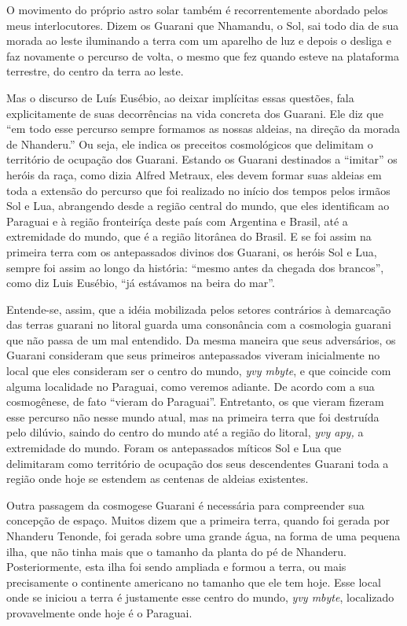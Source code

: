 O movimento do próprio astro solar também é recorrentemente abordado
pelos meus interlocutores. Dizem os Guarani que Nhamandu, o Sol, sai
todo dia de sua morada ao leste iluminando a terra com um aparelho de
luz e depois o desliga e faz novamente o percurso de volta, o mesmo que
fez quando esteve na plataforma terrestre, do centro da terra ao leste.

Mas o discurso de Luís Eusébio, ao deixar implícitas essas questões,
fala explicitamente de suas decorrências na vida concreta dos Guarani.
Ele diz que ``em todo esse percurso sempre formamos as nossas aldeias,
na direção da morada de Nhanderu.'' Ou seja, ele indica os preceitos
cosmológicos que delimitam o território de ocupação dos Guarani. Estando
os Guarani destinados a ``imitar'' os heróis da raça, como dizia Alfred
Metraux, eles devem formar suas aldeias em toda a extensão do percurso
que foi realizado no início dos tempos pelos irmãos Sol e Lua,
abrangendo desde a região central do mundo, que eles identificam ao
Paraguai e à região fronteiríça deste país com Argentina e Brasil, até a
extremidade do mundo, que é a região litorânea do Brasil. E se foi assim
na primeira terra com os antepassados divinos dos Guarani, os heróis Sol
e Lua, sempre foi assim ao longo da história: ``mesmo antes da chegada
dos brancos'', como diz Luis Eusébio, ``já estávamos na beira do mar''.

Entende-se, assim, que a idéia mobilizada pelos setores contrários à
demarcação das terras guarani no litoral guarda uma consonância com a
cosmologia guarani que não passa de um mal entendido. Da mesma maneira
que seus adversários, os Guarani consideram que seus primeiros
antepassados viveram inicialmente no local que eles consideram ser o
centro do mundo, \emph{yvy mbyte}, e que coincide com alguma localidade
no Paraguai, como veremos adiante. De acordo com a sua cosmogênese, de
fato ``vieram do Paraguai''. Entretanto, os que vieram fizeram esse
percurso não nesse mundo atual, mas na primeira terra que foi destruída
pelo dilúvio, saindo do centro do mundo até a região do litoral,
\emph{yvy apy,} a extremidade do mundo. Foram os antepassados míticos
Sol e Lua que delimitaram como território de ocupação dos seus
descendentes Guarani toda a região onde hoje se estendem as centenas de
aldeias existentes.

Outra passagem da cosmogese Guarani é necessária para compreender sua
concepção de espaço. Muitos dizem que a primeira terra, quando foi
gerada por Nhanderu Tenonde, foi gerada sobre uma grande água, na forma
de uma pequena ilha, que não tinha mais que o tamanho da planta do pé de
Nhanderu. Posteriormente, esta ilha foi sendo ampliada e formou a terra,
ou mais precisamente o continente americano no tamanho que ele tem hoje.
Esse local onde se iniciou a terra é justamente esse centro do mundo,
\emph{yvy mbyte}, localizado provavelmente onde hoje é o Paraguai.

